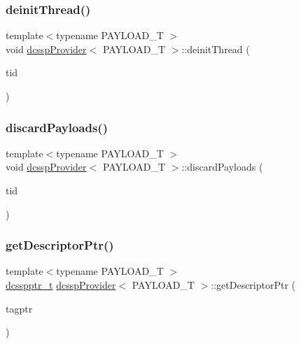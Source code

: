 \mbox{\label{classdcsspProvider_afa6aefab56ad81937a7d9c9220e5c534}} 
\subsubsection{\texorpdfstring{deinit\+Thread()}{deinitThread()}}
{\footnotesize\ttfamily template$<$typename P\+A\+Y\+L\+O\+A\+D\+\_\+T $>$ \\
void \hyperlink{classdcsspProvider}{dcssp\+Provider}$<$ P\+A\+Y\+L\+O\+A\+D\+\_\+T $>$\+::deinit\+Thread (\begin{DoxyParamCaption}\item[{const int}]{tid }\end{DoxyParamCaption})}

\mbox{\label{classdcsspProvider_acf82fd0abf6dce78c3c31bb503ef921b}} 
\subsubsection{\texorpdfstring{discard\+Payloads()}{discardPayloads()}}
{\footnotesize\ttfamily template$<$typename P\+A\+Y\+L\+O\+A\+D\+\_\+T $>$ \\
void \hyperlink{classdcsspProvider}{dcssp\+Provider}$<$ P\+A\+Y\+L\+O\+A\+D\+\_\+T $>$\+::discard\+Payloads (\begin{DoxyParamCaption}\item[{const int}]{tid }\end{DoxyParamCaption})}

\mbox{\label{classdcsspProvider_a93e0873a5c292e4b76eed06189f4c8ce}} 
\subsubsection{\texorpdfstring{get\+Descriptor\+Ptr()}{getDescriptorPtr()}}
{\footnotesize\ttfamily template$<$typename P\+A\+Y\+L\+O\+A\+D\+\_\+T $>$ \\
\hyperlink{dcss__plus_8h_ad9478df19b8b267f41952068562989c0}{dcsspptr\+\_\+t} \hyperlink{classdcsspProvider}{dcssp\+Provider}$<$ P\+A\+Y\+L\+O\+A\+D\+\_\+T $>$\+::get\+Descriptor\+Ptr (\begin{DoxyParamCaption}\item[{\hyperlink{descriptors_8h_afd8a7b57046ed96897cda907f17737a7}{tagptr\+\_\+t}}]{tagptr }\end{DoxyParamCaption})\hspace{0.3cm}{\ttfamily [inline]}}

